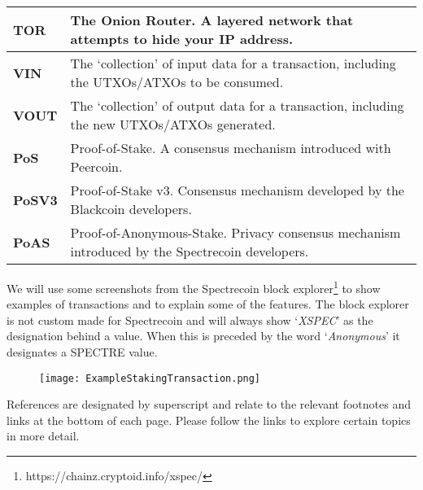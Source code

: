 \begin{table}[h]
{\begin{tabular}{@{}ll@{}}
\textbf{TOR} & The Onion Router. A layered network that attempts to hide 
your IP address. \\ 
\midrule
\textbf{VIN} & The ‘collection’ of input data for a transaction, including 
the UTXOs/ATXOs to be consumed. \\ 
\midrule
\textbf{VOUT} & The ‘collection’ of output data for a transaction, including 
the new UTXOs/ATXOs generated. \\ 
\midrule
\textbf{PoS} & Proof-of-Stake. A consensus mechanism introduced with Peercoin. \\ 
\midrule
\textbf{PoSV3} & Proof-of-Stake v3. Consensus mechanism developed by the 
Blackcoin developers. \\ 
\midrule
\textbf{PoAS} & Proof-of-Anonymous-Stake. Privacy consensus mechanism 
introduced by the Spectrecoin developers. \\ 
\hline
\end{tabular}%
}
\end{table}
\noindent
We will use some screenshots from the Spectrecoin block
explorer\footnote{https://chainz.cryptoid.info/xspec/} to show examples of
transactions and to explain some of the features. The block explorer
is not custom made for Spectrecoin and will always show ‘\textit{XSPEC}’
as the designation behind a value. When this is preceded by the word
‘\textit{Anonymous}’ it designates a SPECTRE value.
\begin{figure}[ht]
	\centering
	\texttt{[image: ExampleStakingTransaction.png]}
\end{figure}
\noindent
References are designated by superscript and relate to the relevant
footnotes and links at the bottom of each page. Please follow the links to
explore certain topics in more detail.
